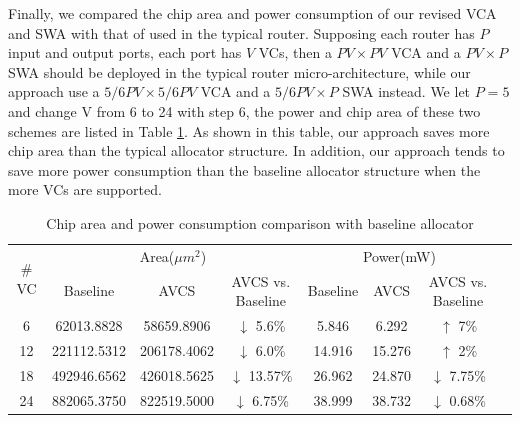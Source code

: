 \documentclass[10pt,conference]{IEEEtran}
\begin{document}
Finally, we compared the chip area and power consumption of our revised VCA and SWA with that of used in the typical router. Supposing each router has $P$ input and output ports, each port has $V$ VCs, then a $PV\times PV$ VCA and a $PV\times P$ SWA should be deployed in the typical router micro-architecture, while our approach use a $5/6PV\times 5/6PV$ VCA and a $5/6PV\times P$ SWA instead. We let $P=5$ and change V from 6 to 24 with step 6, the power and chip area of these two schemes are listed in Table \ref{alloccost}. As shown in this table, our approach saves more chip area than the typical allocator structure. In addition, our approach tends to save more power consumption than the baseline allocator structure when the more VCs are supported.

\begin{table}
\centering\caption{Chip area and power consumption comparison with baseline allocator}\label{alloccost}
\begin{tabular}{|c|c|c|c|c|c|c|c|}
\hline
\multirow{2}{*}{$\#$VC} & \multicolumn{3}{|c|}{Area($\mu m^2$)} & \multicolumn{3}{|c|}{Power(mW)}\\
\cline{2-7}
& Baseline & AVCS & AVCS vs. Baseline & Baseline & AVCS & AVCS vs. Baseline\\
\hline
6 & 62013.8828 & 58659.8906 & $\downarrow$ 5.6\% & 5.846 & 6.292 & $\uparrow$ 7\%\\
\hline
12 & 221112.5312 & 206178.4062 & $\downarrow$ 6.0\% & 14.916 & 15.276 & $\uparrow$ 2\%\\
\hline
18 & 492946.6562 & 426018.5625 & $\downarrow$ 13.57\% & 26.962 & 24.870 & $\downarrow$ 7.75\%\\
\hline
24 & 882065.3750 & 822519.5000 & $\downarrow$ 6.75\% & 38.999 & 38.732 & $\downarrow$ 0.68\%\\
\hline
\end{tabular}
\end{table}
\end{document}

